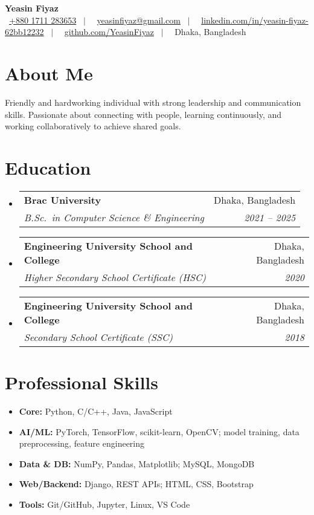 \documentclass[letterpaper,11pt]{article}
\makeatletter
\newcommand{\resumeSubheading}[4]{%
  \vspace{2pt}\item
  \begin{tabular*}{0.97\textwidth}[t]{l@{\extracolsep{\fill}}r}
  \textbf{#1} & #2 \\
  \textit{\small #3} & \textit{\small #4} \\
  \end{tabular*}\vspace{-6pt}
}
\newcommand{\resumeSubHeadingListStart}{\begin{itemize}[leftmargin=0.15in, label={}]}
\newcommand{\resumeSubHeadingListEnd}{\end{itemize}}
\makeatother
\begin{document}
\begin{center}
    {\Huge \bfseries Yeasin Fiyaz} \\[-1pt]
    \small
    \faMobile\ \href{tel:+8801711283653}{+880 1711 283653} \ $|$ \
    \faAt\ \href{mailto:yeasinfiyaz@gmail.com}{yeasinfiyaz@gmail.com} \ $|$ \
    \faLinkedinSquare\ \href{https://www.linkedin.com/in/yeasin-fiyaz-62bb12232/}{linkedin.com/in/yeasin-fiyaz-62bb12232} \ $|$ \
    \faGithub\ \href{https://github.com/YeasinFiyaz}{github.com/YeasinFiyaz} \ $|$ \
    \faMapMarker\ Dhaka, Bangladesh
\end{center}

\section{About Me}
Friendly and hardworking individual with strong leadership and communication skills. Passionate about connecting with people, learning continuously, and working collaboratively to achieve shared goals.

\section{Education}
\resumeSubHeadingListStart
  \resumeSubheading
    {Brac University}{Dhaka, Bangladesh}
    {B.Sc.\ in Computer Science \& Engineering}{2021 -- 2025}
  \resumeSubheading
    {Engineering University School and College}{Dhaka, Bangladesh}
    {Higher Secondary School Certificate (HSC)}{2020}
  \resumeSubheading
    {Engineering University School and College}{Dhaka, Bangladesh}
    {Secondary School Certificate (SSC)}{2018}
\resumeSubHeadingListEnd

\section{Professional Skills}
\resumeSubHeadingListStart
\item \textbf{Core:} Python, C/C++, Java, JavaScript
\item \textbf{AI/ML:} PyTorch, TensorFlow, scikit-learn, OpenCV; model training, data preprocessing, feature engineering
\item \textbf{Data \& DB:} NumPy, Pandas, Matplotlib; MySQL, MongoDB
\item \textbf{Web/Backend:} Django, REST APIs; HTML, CSS, Bootstrap
\item \textbf{Tools:} Git/GitHub, Jupyter, Linux, VS Code
\resumeSubHeadingListEnd
\end{document}
